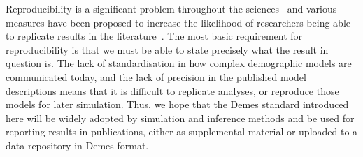 \documentclass[11pt]{article}
\begin{document}
Reproducibility is a significant problem throughout the
sciences~\citep{baker20161} and various measures have been
proposed to increase the likelihood of researchers being
able to replicate results in the
literature~\citep{munafo2017manifesto}. The most basic requirement
for reproducibility is that we must be able to state precisely what
the result in question is. The lack of standardisation in how
complex demographic models are communicated today, and the lack of
precision in the published model descriptions means that it is difficult
to replicate analyses, or reproduce those models for later simulation.
Thus, we hope that the Demes standard introduced here will be widely adopted
by simulation and inference methods and be used for reporting results in
publications, either as supplemental material or uploaded to a data
repository in Demes format.



\end{document}
